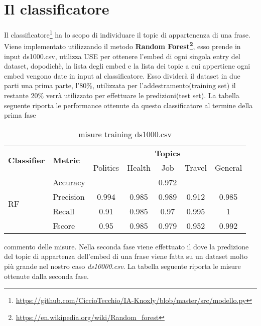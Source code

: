 \section{Il classificatore}
Il classificatore\footnote{\url{https://github.com/CiccioTecchio/IA-Knoxly/blob/master/src/modello.py}} ha lo scopo di individuare il topic di appartenenza di una frase.\newline
Viene implementato utilizzando il metodo \textbf{Random Forest\footnote{\url{https://en.wikipedia.org/wiki/Random_forest}}}, 
esso prende in input ds1000.csv, utilizza USE per ottenere l'embed di ogni singola entry del dataset, dopodichè, la lista degli embed e la lista dei topic a cui appertiene ogni embed vengono date in input al classificatore. Esso dividerà il dataset in due parti una prima parte, l'80\%, utilizzata per l'addestramento(training set) il restante 20\% verrà utilizzato per effettuare le predizioni(test set).\newline
La tabella seguente riporta le performance ottenute da questo classificatore al termine della prima fase
\begin{table}[h]
\begin{tabular}{|l|l|c|c|c|c|c|}
\hline
\multirow{2}{*}{\textbf{Classifier}} & \multirow{2}{*}{\textbf{Metric}} & \multicolumn{5}{c|}{\textbf{Topics}} \\ \cline{3-7} 
 &  & Politics & Health & Job & Travel & General \\ \hline
\multirow{4}{*}{RF} & Accuracy & \multicolumn{5}{c|}{0.972} \\ \cline{2-7} 
 & Precision & 0.994 & 0.985 & 0.989 & 0.912 & 0.985 \\ \cline{2-7} 
 & Recall & 0.91 & 0.985 & 0.97  & 0.995 & 1 \\ \cline{2-7} 
 & Fscore & 0.95 & 0.985 & 0.979 & 0.952 & 0.992 \\ \hline
\end{tabular}
\caption{misure training ds1000.csv}
\end{table}
\FloatBarrier
commento delle misure.\newline
Nella seconda fase viene effettuato il  dove la predizione del topic di appartenza dell'embed di una frase viene fatta su un dataset molto più grande nel nostro caso \textit{ds10000.csv}.\newline
La tabella seguente riporta le misure ottenute dalla seconda fase. 
